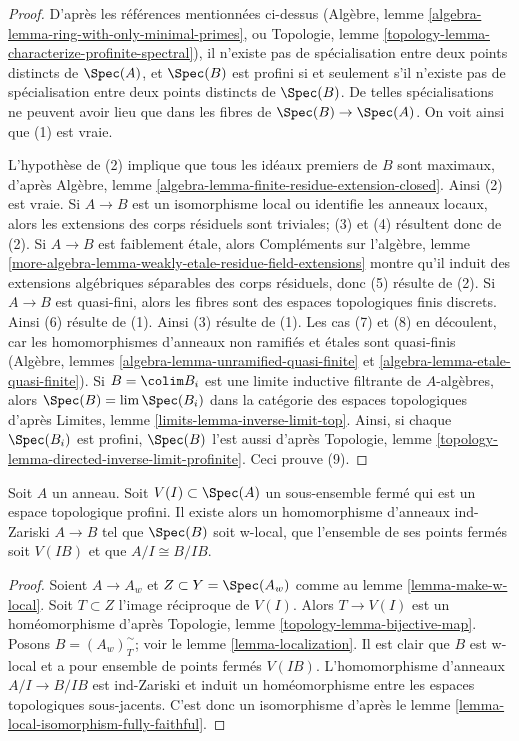 \begin{proof}
D'apr\`es les r\'ef\'erences mentionn\'ees ci-dessus
(Alg\`ebre, lemme \ref{algebra-lemma-ring-with-only-minimal-primes}, ou
Topologie, lemme \ref{topology-lemma-characterize-profinite-spectral}),
il n'existe pas de sp\'ecialisation entre deux points distincts de $\Spec(A)$, et
$\Spec(B)$ est profini si et seulement s'il n'existe pas de sp\'ecialisation
entre deux points distincts de $\Spec(B)$. De telles sp\'ecialisations ne peuvent
avoir lieu que dans les fibres de $\Spec(B) \to \Spec(A)$. On voit ainsi
que (1) est vraie.

\medskip\noindent
L'hypoth\`ese de (2) implique que tous les id\'eaux premiers de $B$ sont maximaux, d'apr\`es
Alg\`ebre, lemme \ref{algebra-lemma-finite-residue-extension-closed}.
Ainsi (2) est vraie.
Si $A \to B$ est un isomorphisme local ou identifie les anneaux locaux,
alors les extensions des corps r\'esiduels sont triviales; (3) et (4)
r\'esultent donc de (2).
Si $A \to B$ est faiblement \'etale, alors Compl\'ements sur l'alg\`ebre, lemme
\ref{more-algebra-lemma-weakly-etale-residue-field-extensions}
montre qu'il induit des extensions alg\'ebriques s\'eparables des corps r\'esiduels, donc
(5) r\'esulte de (2).
Si $A \to B$ est quasi-fini, alors les fibres sont des espaces topologiques
finis discrets. Ainsi (6) r\'esulte de (1).
Ainsi (3) r\'esulte de (1). Les cas (7) et (8)
en d\'ecoulent, car les homomorphismes d'anneaux non ramifi\'es et \'etales sont quasi-finis
(Alg\`ebre, lemmes
\ref{algebra-lemma-unramified-quasi-finite} et
\ref{algebra-lemma-etale-quasi-finite}).
Si $B = \colim B_i$ est une limite inductive filtrante de $A$-alg\`ebres, alors
$\Spec(B) = \lim \Spec(B_i)$ dans la cat\'egorie des espaces topologiques d'apr\`es
Limites, lemme \ref{limits-lemma-inverse-limit-top}.
Ainsi, si chaque $\Spec(B_i)$ est profini, $\Spec(B)$ l'est aussi d'apr\`es
Topologie, lemme \ref{topology-lemma-directed-inverse-limit-profinite}.
Ceci prouve (9).
\end{proof}

\begin{lemma}
\label{lemma-localize-along-closed-profinite}
Soit $A$ un anneau. Soit $V(I) \subset \Spec(A)$ un sous-ensemble ferm\'e
qui est un espace topologique profini. Il existe alors un
homomorphisme d'anneaux ind-Zariski $A \to B$ tel que $\Spec(B)$ soit w-local,
que l'ensemble de ses points ferm\'es soit $V(IB)$ et que $A/I \cong B/IB$.
\end{lemma}

\begin{proof}
Soient $A \to A_w$ et $Z \subset Y = \Spec(A_w)$ comme au
lemme \ref{lemma-make-w-local}.
Soit $T \subset Z$ l'image r\'eciproque de $V(I)$.
Alors $T \to V(I)$ est un hom\'eomorphisme d'apr\`es
Topologie, lemme \ref{topology-lemma-bijective-map}.
Posons $B = (A_w)_T^\sim$; voir le lemme \ref{lemma-localization}.
Il est clair que $B$ est w-local et a pour ensemble de points ferm\'es $V(IB)$.
L'homomorphisme d'anneaux $A/I \to B/IB$ est ind-Zariski
et induit un hom\'eomorphisme entre les espaces topologiques
sous-jacents. C'est donc un isomorphisme d'apr\`es le
lemme \ref{lemma-local-isomorphism-fully-faithful}.
\end{proof}

